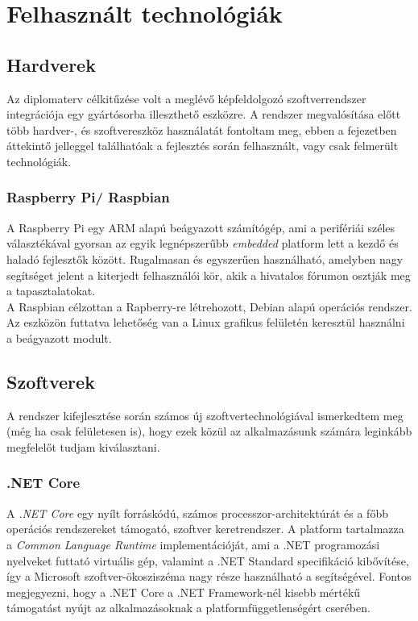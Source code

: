 \chapter{Felhasznált technológiák} \label{chapter:technologiak}
\section{Hardverek}

Az diplomaterv célkitűzése volt a meglévő képfeldolgozó szoftverrendszer integrációja egy gyártósorba illeszthető eszközre. A rendszer megvalósítása előtt több hardver-, és szoftvereszköz használatát fontoltam meg, ebben a fejezetben áttekintő jelleggel találhatóak a fejlesztés során felhasznált, vagy csak felmerült technológiák.

\subsection{Raspberry Pi/ Raspbian}

A Raspberry Pi egy ARM alapú beágyazott számítógép, ami a perifériái széles választékával gyorsan az egyik legnépszerűbb \textit{embedded} platform lett a kezdő és haladó fejlesztők között. Rugalmasan és egyszerűen használható, amelyben nagy segítséget jelent a kiterjedt felhasználói kör, akik a hivatalos fórumon osztják meg a tapasztalatokat. \\
A Raspbian célzottan a Rapberry-re létrehozott, Debian alapú operációs rendszer. Az eszközön futtatva lehetőség van a Linux grafikus felületén keresztül használni a beágyazott modult.

\section{Szoftverek}

A rendszer kifejlesztése során számos új szoftvertechnológiával ismerkedtem meg (még ha csak felületesen is), hogy ezek közül az alkalmazásunk számára leginkább megfelelőt tudjam kiválasztani.

\subsection{.NET Core} \label{subsec:netcore_intro}
A \emph{.NET Core} egy nyílt forráskódú, számos processzor-architektúrát és a főbb operációs rendszereket támogató, szoftver keretrendszer. A platform tartalmazza a \emph{Common Language Runtime} implementációját, ami a .NET programozási nyelveket futtató virtuális gép, valamint a .NET Standard specifikáció kibővítése, így a Microsoft szoftver-ökosziszéma nagy része használható a segítségével. Fontos megjegyezni, hogy a .NET Core a .NET Framework-nél kisebb mértékű támogatást nyújt az alkalmazásoknak a platformfüggetlenségért cserében. 

